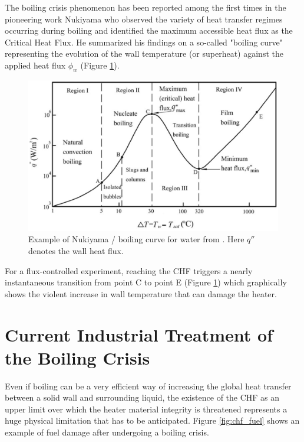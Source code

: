 The boiling crisis phenomenon has been reported among the first times in the pioneering work Nukiyama \cite{nukiyama_maximum_1966} who observed the variety of heat transfer regimes occurring during boiling and identified the maximum accessible heat flux as the Critical Heat Flux. He summarized his findings on a so-called "boiling curve" representing the evolution of the wall temperature (or superheat) against the applied heat flux $\phi_{w}$ (Figure \ref{fig:nukiyama_curve}).

\begin{figure}[!h]
\centering
\includegraphics[width=0.7\linewidth]{img/intro/nukiyama.png}
\caption{Example of Nukiyama / boiling curve for water from \cite{faghri_10_2006}. Here $q''$ denotes the wall heat flux.}
\label{fig:nukiyama_curve}
\end{figure}


\npar

For a flux-controlled experiment, reaching the CHF triggers a nearly instantaneous transition from point C to point E (Figure \ref{fig:nukiyama_curve}) which graphically shows the violent increase in wall temperature that can damage the heater.


\section{Current Industrial Treatment of the Boiling Crisis}

Even if boiling can be a very efficient way of increasing the global heat transfer between a solid wall and surrounding liquid, the existence of the CHF as an upper limit over which the heater material integrity is threatened represents a huge physical limitation that has to be anticipated. Figure \ref{fig:chf_fuel} shows an example of fuel damage after undergoing a boiling crisis.


